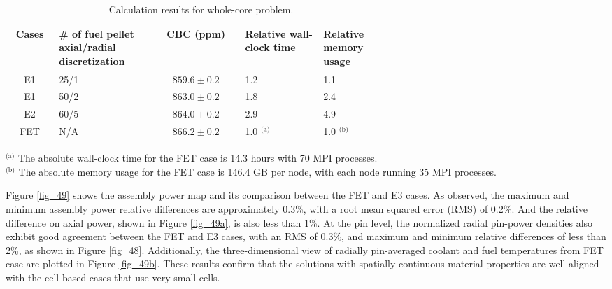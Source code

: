 \begin{table}
    \centering
    \caption{Calculation results for whole-core problem.}
    \label{tab33} 
        \begin{tabular}{| c | C{0.25\linewidth} | c | C{0.2\linewidth} | C{0.2\linewidth} | }
            \hline 
            Cases & \# of fuel pellet axial/radial discretization & CBC (ppm) & Relative wall-clock time & Relative memory usage \\
            \hline
            E1     & 25/1  & $859.6\pm0.2$ & 1.2 & 1.1      \\ \hline
            E1     & 50/2  & $863.0\pm0.2$ & 1.8 & 2.4      \\ \hline
            E2     & 60/5  & $864.0\pm0.2$ & 2.9 & 4.9      \\ \hline
            FET    & N/A   & $866.2\pm0.2$ & 1.0 $^\text{(a)}$ & 1.0 $^\text{(b)}$      \\ \hline
        \end{tabular}
    \begin{flushleft}
        \small
        $^\text{(a)}$ The absolute wall-clock time for the FET case is 14.3 hours with 70 MPI processes. \\
        $^\text{(b)}$ The absolute memory usage for the FET case is 146.4 GB per node, with each node running 35 MPI processes.
    \end{flushleft}
\end{table}

Figure \ref{fig_49} shows the assembly power map and its comparison between the FET and E3 cases. As observed, the maximum and minimum assembly power relative differences are approximately 0.3\%, with a root mean squared error (RMS) of 0.2\%. And the relative difference on axial power, shown in Figure \ref{fig_49a}, is also less than 1\%. At the pin level, the normalized radial pin-power densities also exhibit good agreement between the FET and E3 cases, with an RMS of 0.3\%, and maximum and minimum relative differences of less than 2\%, as shown in Figure \ref{fig_48}. Additionally, the three-dimensional view of radially pin-averaged coolant and  fuel temperatures from FET case are plotted in Figure \ref{fig_49b}. These results confirm that the solutions with spatially continuous material properties are well aligned with the cell-based cases that use very small cells.


